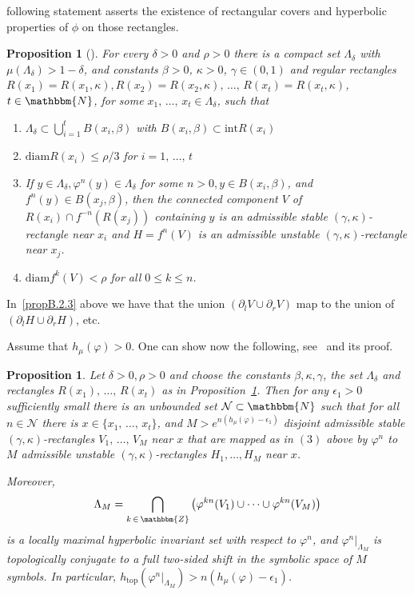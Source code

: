 \documentclass[10pt,a4paper]{amsart}
\numberwithin{equation}{section}
\newcommand{\N}{\mathbbm{N}}
\newcommand{\Z}{\mathbbm{Z}}
\newcommand{\topo}{\mathrm{top}}
\newcommand{\intt}{\mathrm{int}}
\newcommand{\diam}{\mathrm{diam}}
\newcommand{\clN}{\mathcal{N}}
\newtheorem{prop}[theo]{Proposition}
\theoremstyle{definition}
\theoremstyle{remark}
\begin{document}
following statement asserts the existence of rectangular covers and hyperbolic properties of $\phi$ on those rectangles.

\begin{prop}[{\cite[Theorem S.4.16]{Hasselblatt-Katok}}]\label{prop:KatokRectangles}
For every $\delta>0$ and $\rho>0$ there is a compact set $\Lambda_{\delta}$ with $\mu(\Lambda_{\delta})>1-\delta$, and constants $\beta>0$, $\kappa>0$, $\gamma\in (0,1)$ and regular rectangles $R(x_1) = R(x_1,\kappa), R(x_2) = R(x_2,\kappa), \,\ldots,\, R(x_t)= R(x_t,\kappa)$, $t\in \N$, for some $x_1, \,\ldots,\, x_t \in \Lambda_{\delta}$, such that
\begin{enumerate}
\item\label{propB.2.1} $\Lambda_{\delta} \subset \bigcup_{i=1}^t B(x_i, \beta)$ with $B(x_i, \beta) \subset {\intt}R(x_i)$
\item \label{propB.2.2}${\diam}R(x_i) \leq \rho/3$ for $i=1, \,\ldots,\, t$
\item\label{propB.2.3} If $y\in \Lambda_{\delta}, \varphi^n(y) \in \Lambda_{\delta}$ for some $n>0, y \in B(x_i, \beta)$, and $f^n(y) \in B(x_j, \beta)$, then the connected component $V$ of $R(x_i)\cap f^{-n}(R(x_j))$ containing $y$ is an admissible stable $(\gamma, \kappa)$-rectangle near $x_i$ and $H= f^n(V)$ is an admissible unstable $(\gamma, \kappa)$-rectangle near $x_j$.
\item\label{propB.2.4} $\diam f^k(V) < \rho$ for all $0\leq k \leq n$.
\end{enumerate}
\end{prop}

In~\eqref{propB.2.3} above we have that the union $(\partial_l V \cup \partial_r V)$ map to the union of $(\partial_l H \cup \partial_r H)$, etc.

Assume that $h_{\mu}(\varphi)>0$. One can show now the following, see~\cite[Theorem~S.5.9]{Hasselblatt-Katok} and its proof.

\begin{prop}\label{prop:KatokHorseshoe}
Let $\delta>0, \rho>0$ and choose the constants $\beta, \kappa, \gamma$, the set $\Lambda_{\delta}$ and rectangles $R(x_1),\, \ldots,\, R(x_t)$ as in Proposition~\ref{prop:KatokRectangles}. Then for any $\epsilon_1>0$ sufficiently small there is an unbounded set $\clN \subset \N$ such that for all $n\in \clN$ there is $x \in \{x_1, \,\ldots,\, x_t\}$, and $M > e^{n(h_{\mu}(\varphi) - \epsilon_1)}$ disjoint admissible stable $(\gamma,\kappa)$-rectangles $V_1, \,\ldots,\, V_M$ near $x$ that are mapped as in $(3)$ above by $\varphi^n$ to $M$ admissible unstable $(\gamma,\kappa)$-rectangles $H_1, \ldots, H_M$ near $x$.

Moreover,
\[
\Lambda_M =\bigcap_{k\, \in\, \Z} \left(\varphi^{kn}(V_1) \cup \cdots \cup \varphi^{kn}(V_{M})\right)
\]
is a locally maximal hyperbolic invariant set with respect to $\varphi^n$, and $\varphi^n|_{\Lambda_M}$ is topologically conjugate to a full two-sided shift in the symbolic space of $M$ symbols. In particular, $h_{\topo}(\varphi^n|_{\Lambda_M}) > n(h_{\mu}(\varphi) - \epsilon_1)$.
\end{prop}
\end{document}
